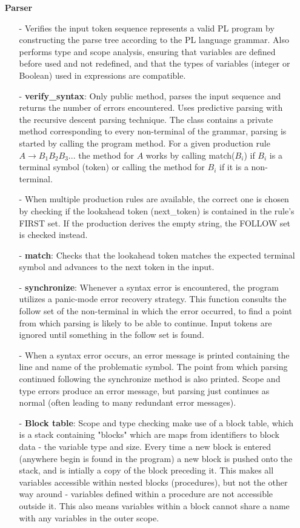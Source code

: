 \documentclass{article}
\begin{document}
\begin{itemize}
        \item[]\textbf{Parser}
            \begin{itemize}
                \item[-] Verifies the input token sequence represents a valid PL program by constructing the parse tree according to the PL language grammar. Also performs type and scope analysis, ensuring that variables are defined before used and not redefined, and that the types of variables (integer or Boolean) used in expressions are compatible.
                \item[-] \textbf{verify\_syntax}: Only public method, parses the input sequence and returns the number of errors encountered. Uses predictive parsing with the recursive descent parsing technique. The class contains a private method corresponding to every non-terminal of the grammar, parsing is started by calling the program method. For a given production rule $A \longrightarrow B_1B_2B_3...$ the method for $A$ works by calling match($B_i$) if $B_i$ is a terminal symbol (token) or calling the method for $B_i$ if it is a non-terminal.
                \item[-] When multiple production rules are available, the correct one is chosen by checking if the lookahead token (next\_token) is contained in the rule's FIRST set. If the production derives the empty string, the FOLLOW set is checked instead.
                \item[-] \textbf{match}: Checks that the lookahead token matches the expected terminal symbol and advances to the next token in the input.
                \item[-] \textbf{synchronize}: Whenever a syntax error is encountered, the program utilizes a panic-mode error recovery strategy. This function consults the follow set of the non-terminal in which the error occurred, to find a point from which parsing is likely to be able to continue. Input tokens are ignored until something in the follow set is found. 
                \item[-] When a syntax error occurs, an error message is printed containing the line and name of the problematic symbol. The point from which parsing continued following the synchronize method is also printed. Scope and type errors produce an error message, but parsing just continues as normal (often leading to many redundant error messages). 
                \item[-] \textbf{Block table}: Scope and type checking make use of a block table, which is a stack containing "blocks" which are maps from identifiers to block data - the variable type and size. Every time a new block is entered (anywhere begin is found in the program) a new block is pushed onto the stack, and is intially a copy of the block preceding it. This makes all variables accessible within nested blocks (procedures), but not the other way around - variables defined within a procedure are not accessible outside it. This also means variables within a block cannot share a name with any variables in the outer scope.
            \end{itemize}


\end{itemize}
\end{document}
